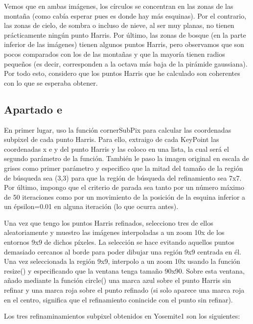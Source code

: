 \documentclass[10pt,a4paper]{article}
\begin{document}
Vemos que en ambas imágenes, los círculos se concentran en las zonas de las montaña (como cabía esperar pues es donde hay más esquinas). Por el contrario, las zonas de cielo, de sombra o incluso de nieve, al ser muy planas, no tienen prácticamente ningún punto Harris. Por último, las zonas de bosque (en la parte inferior de las imágenes) tienen algunos puntos Harris, pero observamos que son pocos comparados con los de las montañas y que la mayoría tienen radios pequeños (es decir, corresponden a la octava más baja de la pirámide gaussiana). Por todo esto, considero que los puntos Harris que he calculado son coherentes con lo que se esperaba obtener.

\subsection{Apartado e}
En primer lugar, uso la función cornerSubPix para calcular las coordenadas subpixel de cada punto Harris. Para ello, extraigo de cada KeyPoint las coordenadas x e y del punto Harris y las coloco en una lista, la cual será el segundo parámetro de la función. También le paso la imagen original en escala de grises como primer parámetro y especifico que la mitad del tamaño de la región de búsqueda sea (3,3) para que la región de búsqueda del refinamiento sea 7x7. Por último, impongo que el criterio de parada sea tanto por un número máximo de 50 iteraciones como por un movimiento de la posición de la esquina inferior a un épsilon=0.01 en alguna iteración (lo que ocurra antes).

Una vez que tengo los puntos Harris refinados, selecciono tres de ellos aleatoriamente y muestro las imágenes interpoladas a un zoom 10x de los entornos 9x9 de dichos píxeles. La selección se hace evitando aquellos puntos demasiado cercanos al borde para poder dibujar una región 9x9 centrada en él. Una vez seleccionada la región 9x9, interpolo a un zoom 10x usando la función resize() y especificando que la ventana tenga tamaño 90x90. Sobre esta ventana, añado mediante la función circle() una marca azul sobre el punto Harris sin refinar y una marca roja sobre el punto refinado (si solo aparece una marca roja en el centro, significa que el refinamiento conincide con el punto sin refinar).

Los tres refinaminamientos subpixel obtenidos en Yosemite1 son los siguientes:
\end{document}
